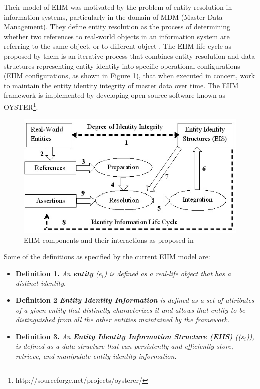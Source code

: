 Their model of EIIM was motivated by the problem of entity resolution in information systems, particularly in the domain of MDM (Master Data Management). They define entity resolution as the process of determining whether two references to real-world objects in an information system are referring to the same object, or to different object \cite{talburt2011entity}. The EIIM life cycle as proposed by them is an iterative process that combines entity resolution and data structures representing entity identity into specific operational configurations (EIIM configurations, as shown in Figure \ref{originalEIIM}), that when executed in concert, work to maintain the entity identity integrity of master data over time. The EIIM framework is implemented by developing open source software known as OYSTER\footnote{http://sourceforge.net/projects/oysterer/}.

\begin{figure}[htbp]
  \caption{EIIM components and their interactions as proposed in \cite{zhou2011entity}}
\label{originalEIIM}
  \centering
    \includegraphics[width=12cm,height=6cm]{Figures/originalEIIM.jpg}
\end{figure}

Some of the definitions as specified by the current EIIM model are:

\begin{itemize}
\item \textbf{Definition 1.} \textit{An \textbf{entity} (\textbf{$e_{i}$}) is defined as a real-life object that has a distinct identity}.

\item \textbf{Definition 2} \textit{\textbf{Entity Identity Information} is defined as a set of attributes of a given entity that distinctly characterizes it and allows that entity to be distinguished from all the other entities maintained by the framework.}

\item \textbf{Definition 3.} \textit{An \textbf{Entity Identity Information Structure (EIIS)} ((\textbf{$s_{i}$})), is defined as a data structure that can persistently and efficiently store, retrieve, and manipulate entity identity information}.
\end{itemize}

